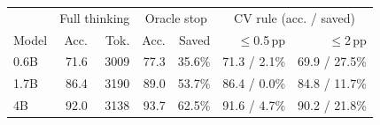 \begin{tabular}{lrrrrrr}
\toprule
 & \multicolumn{2}{c}{Full thinking} & \multicolumn{2}{c}{Oracle stop} & \multicolumn{2}{c}{CV rule (acc. / saved)} \\
Model & Acc. & Tok. & Acc. & Saved & $\le$0.5\,pp & $\le$2\,pp \\
\midrule
0.6B & 71.6 & 3009 & 77.3 & 35.6\% & 71.3 / 2.1\% & 69.9 / 27.5\% \\
1.7B & 86.4 & 3190 & 89.0 & 53.7\% & 86.4 / 0.0\% & 84.8 / 11.7\% \\
4B & 92.0 & 3138 & 93.7 & 62.5\% & 91.6 / 4.7\% & 90.2 / 21.8\% \\
\bottomrule
\end{tabular}
